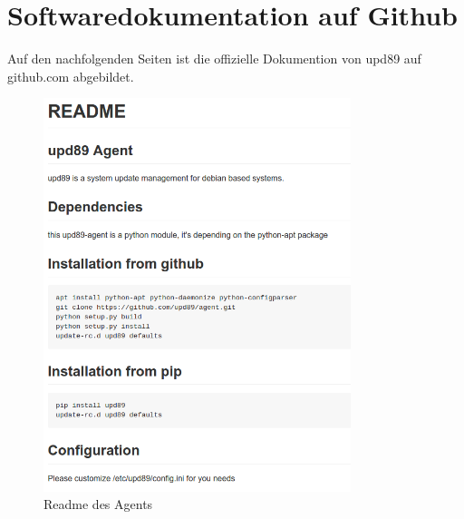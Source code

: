 \chapter{Softwaredokumentation auf Github} \label{appendix:documentation}

Auf den nachfolgenden Seiten ist die offizielle Dokumention von upd89 auf github.com abgebildet.



%

\begin{figure}
    \centering
    \includegraphics[width=0.8\textwidth]{fig/agent_readme}
    \caption{Readme des Agents}
    \label{fig:appendix:documentation:agent}
\end{figure}